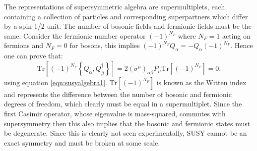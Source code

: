 The representations of supersymmetric algebra are supermultiplets, each containing a collection of particles and corresponding superpartners which differ by a spin-1/2 unit. The number of bosonic fields and fermionic fields must be the same. Consider the fermionic number operator $(-1)^{N_F}$ where $N_{F}=1$ acting on fermions and $N_{F}=0$ for bosons, this implies $(-1)^{N_F}Q_{\alpha}=-Q_{\alpha}(-1)^{N_F}$. Hence one can prove that:
\begin{equation}
\text{Tr}\left[(-1)^{N_F} \left\{ Q_{\alpha},Q^{\dagger}_{\dot{\beta}} \right\} \right]=
2(\sigma^{\mu})_{\alpha\dot{\beta}}P_{\mu}\text{Tr}\left[(-1)^{N_F} \right]=0.
\label{eqn:trace}
\end{equation}
using equation \ref{eqn:susyalgebra1}. $\text{Tr}\left[(-1)^{N_F} \right]$ is known as the Witten index and represents the difference between the number of bosonic and fermionic degrees of freedom, which clearly must be equal in a supermultiplet. Since the first Casimir operator, whose eigenvalue is mass-squared, commutes with supersymmetry then this also implies that the bosonic and fermionic states must be degenerate. Since this is clearly not seen experimentally, SUSY cannot be an exact symmetry and must be broken at some scale.

